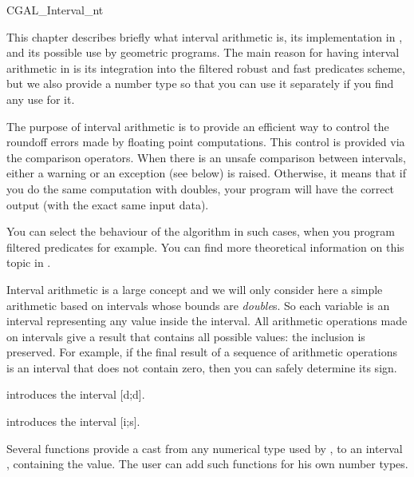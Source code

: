 
\begin{ccClass} {CGAL_Interval_nt}
\label{interval}

This chapter describes briefly what interval arithmetic is, its implementation
in {\cgal}, and its possible use by geometric programs.
The main reason for having interval arithmetic in {\cgal} is its integration
into the filtered robust and fast predicates scheme, but we also provide a
number type so that you can use it separately if you find any use for it.

The purpose of interval arithmetic is to provide an efficient way to control
the roundoff errors made by floating point computations.  This control is
provided via the comparison operators.  When there is an unsafe comparison
between intervals, either a warning or an exception (see below) is raised.
Otherwise, it means that if you do the same computation with doubles, your
program will have the correct output (with the exact same input data).

You can select the behaviour of the algorithm in such cases, when you program
filtered predicates for example.  You can find more theoretical information on
this topic in \cite{bbp-iayed-98scg}.

\ccDefinition
Interval arithmetic is a large concept and we will only consider here a 
simple arithmetic based on intervals whose bounds are {\it double}s.
So each variable is an interval representing any value inside the interval.
All arithmetic operations made on intervals give a result that contains all
possible values: the inclusion is preserved.
For example, if the final result of a sequence of arithmetic operations is
an interval that does not contain zero, then you can safely determine its sign.


\ccCreation

{introduces the interval [d;d].}

{introduces the interval [i;s].}

Several functions  provide a cast from any
numerical type used by {\cgal}, to an interval ,
containing the value.  The user can add such functions for his own number
types.



\end{ccClass}
